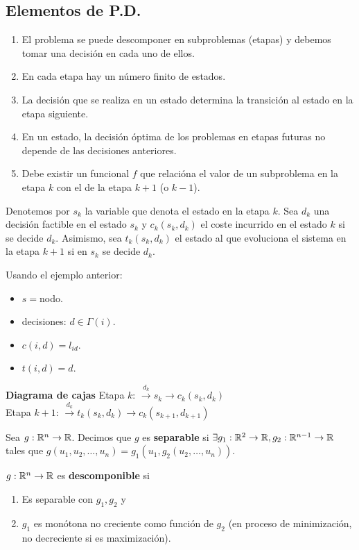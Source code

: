 \documentclass[MIOP.tex]{subfiles}
\begin{document}
\subsection{Elementos de P.D.}
\begin{enumerate}
\item El problema se puede descomponer en subproblemas (etapas) y debemos tomar una decisión en cada uno de ellos.
\item En cada etapa hay un número finito de estados.
\item La decisión que se realiza en un estado determina la transición al estado en la etapa siguiente.
\item En un estado, la decisión óptima de los problemas en etapas futuras no depende de las decisiones anteriores. 
\item Debe existir un funcional $f$ que relacióna el valor de un subproblema en la etapa $k$ con el de la etapa $k+1$ (o $k-1$). 
\end{enumerate}

Denotemos por $s_k$ la variable que denota el estado en la etapa $k$. Sea $d_k$ una decisión factible en el estado $s_k$ y $c_k(s_k,d_k)$ el coste incurrido en el estado $k$ si se decide $d_k$. Asimismo, sea $t_k(s_k,d_k)$ el estado al que evoluciona el sistema en la etapa $k+1$ si en $s_k$ se decide $d_k$.

Usando el ejemplo anterior:
\begin{itemize}
\item $s=$nodo.
\item decisiones: $d\in\Gamma(i)$.
\item $c(i,d)=l_{id}$.
\item $t(i,d)=d$.
\end{itemize}

\textbf{Diagrama de cajas}
Etapa $k$:
$\overset{d_k}{\longrightarrow}\boxed{s_k}\rightarrow c_k(s_k,d_k)$\\
Etapa $k+1$:
$\overset{d_k}{\longrightarrow}\boxed{t_k(s_k,d_k)}\rightarrow c_k(s_{k+1},d_{k+1})$

\begin{defi}
Sea $g:\mathbb{R}^n\to\mathbb{R}$. Decimos que $g$ es \textbf{separable} si $\exists g_1:\mathbb{R}^2\to\mathbb{R},g_2:\mathbb{R}^{n-1}\to\mathbb{R}$ tales que $g(u_1,u_2,\dots,u_n)=g_1(u_1,g_2(u_2,\dots,u_n))$. 
\end{defi}

\begin{defi}
$g:\mathbb{R}^n\to\mathbb{R}$ es \textbf{descomponible} si
\begin{enumerate}
\item Es separable con $g_1,g_2$ y
\item $g_1$ es monótona no creciente como función de $g_2$ (en proceso de minimización, no decreciente si es maximización). 
\end{enumerate}
\end{defi}
\end{document}

